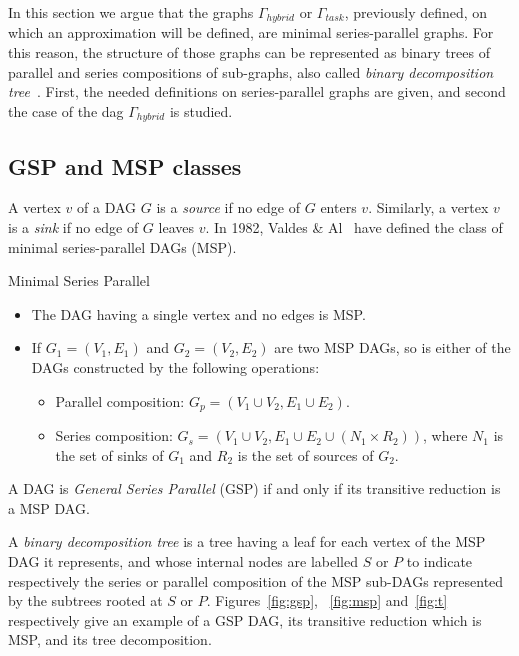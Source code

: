 In this section we argue that the graphs $\Gamma_{hybrid}$ or $\Gamma_{task}$, previously defined, on which an approximation will be defined, are minimal series-parallel graphs. For this reason, the structure of those graphs can be represented as binary trees of parallel and series compositions of sub-graphs, also called \emph{binary decomposition tree}~\cite{Valdes:1979:RSP:800135.804393}. First, the needed definitions on series-parallel graphs are given, and second the case of the dag $\Gamma_{hybrid}$ is studied.

\subsection{GSP and MSP classes}
A vertex $v$ of a DAG $G$ is a \emph{source} if no edge of $G$ enters $v$. Similarly, a vertex $v$ is a \emph{sink} if no edge of $G$ leaves $v$. In 1982, Valdes \& Al~\cite{Valdes:1979:RSP:800135.804393} have defined the class of minimal series-parallel DAGs (MSP).

\begin{mydef}Minimal Series Parallel
\begin{itemize}
\item The DAG having a single vertex and no edges is MSP.
\item If $G_1=(V_1,E_1)$ and $G_2=(V_2,E_2)$ are two MSP DAGs, so is either of the DAGs constructed by the following operations:
\begin{itemize}
\item Parallel composition: $G_p=(V_1\cup V_2,E_1\cup E_2)$.
\item Series composition: $G_s=(V_1\cup V_2,E_1\cup E_2\cup (N_1 \times R_2))$, where $N_1$ is the set of sinks of $G_1$ and $R_2$ is the set of sources of $G_2$.
\end{itemize}
\end{itemize}
\end{mydef}

\begin{mydef}
A DAG is \emph{General Series Parallel} (GSP) if and only if its transitive reduction is a MSP DAG.
\end{mydef}

A \emph{binary decomposition tree} is a tree having a leaf for each vertex of the MSP DAG it represents, and whose internal nodes are labelled $S$ or $P$ to indicate respectively the series or parallel composition of the MSP sub-DAGs represented by the subtrees rooted at $S$ or $P$. Figures~\ref{fig:gsp}, ~\ref{fig:msp} and~\ref{fig:t} respectively give an example of a GSP DAG, its transitive reduction which is MSP, and its tree decomposition.

